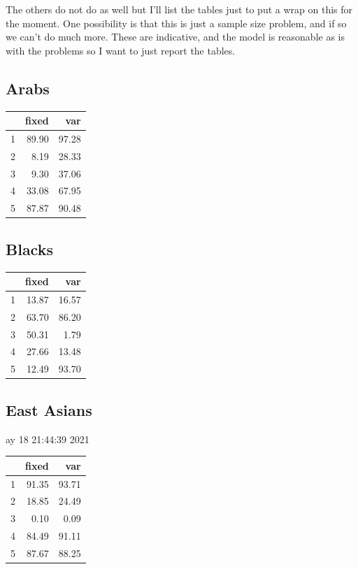 \documentclass{amsart}
\begin{document}
The others do not do as well but I'll list the tables just to put a wrap on this for the moment.  One possibility is that this is just a sample size problem, and if so we can't do much more. These are indicative, and the model is reasonable as is with the problems so I want to just report the tables.

\pagebreak
\subsection{Arabs}

\begin{table}[ht]
\centering
\begin{tabular}{rrr}
  \hline
 & fixed & var \\ 
  \hline
1 & 89.90 & 97.28 \\ 
  2 & 8.19 & 28.33 \\ 
  3 & 9.30 & 37.06 \\ 
  4 & 33.08 & 67.95 \\ 
  5 & 87.87 & 90.48 \\ 
   \hline
\end{tabular}
\end{table}

\subsection{Blacks}
\begin{table}[ht]
\centering
\begin{tabular}{rrr}
  \hline
 & fixed & var \\ 
  \hline
1 & 13.87 & 16.57 \\ 
  2 & 63.70 & 86.20 \\ 
  3 & 50.31 & 1.79 \\ 
  4 & 27.66 & 13.48 \\ 
  5 & 12.49 & 93.70 \\ 
   \hline
\end{tabular}
\end{table}

\subsection{East Asians}

ay 18 21:44:39 2021
\begin{table}[ht]
\centering
\begin{tabular}{rrr}
  \hline
 & fixed & var \\ 
  \hline
1 & 91.35 & 93.71 \\ 
  2 & 18.85 & 24.49 \\ 
  3 & 0.10 & 0.09 \\ 
  4 & 84.49 & 91.11 \\ 
  5 & 87.67 & 88.25 \\ 
   \hline
\end{tabular}
\end{table}
\end{document}
